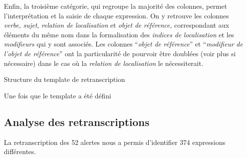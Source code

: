 Enfin, la troisième catégorie, qui regroupe la majorité des colonnes,
permet l'interprétation et la saisie de chaque expression. On y
retrouve les colonnes \emph{verbe,} \emph{sujet,} \emph{relation de
  localisation} et \emph{objet de référence,} correspondant aux
éléments du même nom dans la formalisation des \emph{indices de
  localisation} et les \emph{modifieurs} qui y sont associés.
%
Les colonnes \enquote{\emph{objet de référence}} et
\enquote{\emph{modifieur de l'objet de référence}} ont la
particularité de pourvoir être doublées (voir plus si nécessaire) dans
le cas où la \emph{relation de localisation} le nécessiterait.


\begin{table}
  \centering
  
  \caption{Structure du template de retranscription}
  \label{tab:struct_temp}
\end{table}

Une fois que le template a été défini

\subsection{Analyse des retranscriptions}

La retranscription des 52 alertes nous a permis d'identifier 374
expressions différentes.

